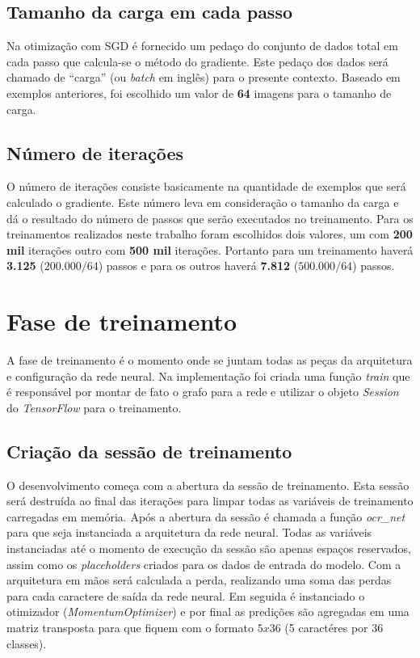 \subsection{Tamanho da carga em cada passo}

Na otimização com SGD é fornecido um pedaço do conjunto de dados
total em cada passo que calcula-se o método do gradiente. Este pedaço
dos dados será chamado de ``carga'' (ou \textit{batch} em inglês) para
o presente contexto. Baseado em exemplos anteriores, foi escolhido um
valor de {\bf 64} imagens para o tamanho de carga.

\subsection{Número de iterações}

O número de iterações consiste basicamente na quantidade de exemplos
que será calculado o gradiente. Este número leva em consideração o
tamanho da carga e dá o resultado do número de passos que serão
executados no treinamento. Para os treinamentos realizados neste
trabalho foram escolhidos dois valores, um com {\bf 200 mil} iterações
outro com {\bf 500 mil} iterações. Portanto para um treinamento
haverá {\bf 3.125} ($200.000 / 64$) passos e para os outros haverá
{\bf 7.812} ($500.000 / 64$) passos.

\section{Fase de treinamento} \label{treino}

A fase de treinamento é o momento onde se juntam todas as peças da
arquitetura e configuração da rede neural. Na implementação foi
criada uma função \textit{train} que é responsável por montar de fato
o grafo para a rede e utilizar o objeto \textit{Session} do
\textit{TensorFlow} para o treinamento.

\subsection{Criação da sessão de treinamento}

O desenvolvimento começa com a abertura da sessão de treinamento. Esta
sessão será destruída ao final das iterações para limpar todas as
variáveis de treinamento carregadas em memória. Após a abertura da
sessão é chamada a função \textit{ocr\_net} para que seja instanciada a
arquitetura da rede neural. Todas as variáveis instanciadas até o
momento de execução da sessão são apenas espaços reservados, assim
como os \textit{placeholders} criados para os dados de entrada do
modelo. Com a arquitetura em mãos será calculada a perda, realizando
uma soma das perdas para cada caractere de saída da rede neural. Em
seguida é instanciado o otimizador (\textit{MomentumOptimizer}) e por
final as predições são agregadas em uma matriz transposta para que
fiquem com o formato $5x36$ (5 caractéres por 36 classes).

